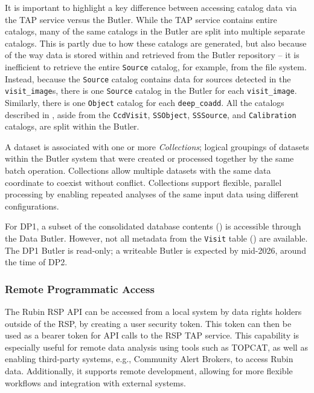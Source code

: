 It is important to highlight a key difference between accessing catalog data via the \gls{TAP} service versus the Butler. 
While the \gls{TAP} service contains entire catalogs, many of the same catalogs in the Butler are split into multiple separate catalogs. 
This is partly due to how these catalogs are generated, but also because of the way data is stored within and retrieved from the Butler repository -- it is inefficient to retrieve the entire \texttt{Source} catalog, for example, from the file system. 
Instead, because the \texttt{Source} catalog contains data for sources detected in the \texttt{visit\_image}s, there is one \texttt{Source} catalog in the Butler for each \texttt{visit\_image}. Similarly, there is one \texttt{Object} catalog for each \texttt{deep\_coadd}. 
All the catalogs described in , aside from the \texttt{CcdVisit}, \texttt{SSObject}, \texttt{SSSource}, and \texttt{Calibration} catalogs, are split within the Butler.


A dataset is associated with one or more \emph{Collections}; logical groupings of  datasets within the \gls{Butler} system that were created or processed together by the same batch operation.
Collections allow multiple datasets with the same data coordinate to coexist without conflict.
Collections support flexible, parallel processing by enabling repeated analyses of the same input data using different configurations.

For \gls{DP1}, a subset of the consolidated database contents () is accessible through the Data Butler.
However, not all metadata from the \texttt{Visit} table () are available.
The \gls{DP1} Butler is read-only; a writeable Butler is expected by mid-2026, around the time of \gls{DP2}.

\subsubsection{Remote Programmatic Access}
\label{sssec:remote_api}
The Rubin \gls{RSP} \gls{API} can be accessed from a local system by data rights holders outside of the \gls{RSP}, by creating a user security token. This token can then be used as a bearer token for \gls{API} calls to the \gls{RSP} TAP service.
This capability is especially useful for remote data analysis using tools such as \gls{TOPCAT}, as well as enabling third-party systems, e.g., Community Alert Brokers, to access Rubin data. 
Additionally, it supports remote development, allowing for more flexible workflows and integration with external systems.

